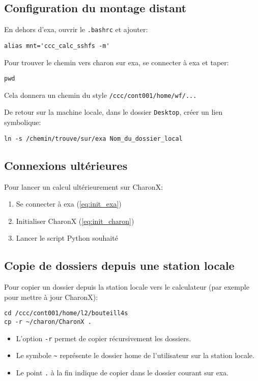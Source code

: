 \documentclass[10pt]{book}
\begin{document}
\begin{appendices}
\subsection{Configuration du montage distant}
En dehors d'exa, ouvrir le \texttt{.bashrc} et ajouter:
\begin{verbatim}
alias mnt='ccc_calc_sshfs -m'
\end{verbatim}
Pour trouver le chemin vers charon sur exa, se connecter à exa et taper:
\begin{verbatim}
pwd
\end{verbatim}
Cela donnera un chemin du style \texttt{/ccc/cont001/home/wf/...}

De retour sur la machine locale, dans le dossier \texttt{Desktop}, créer un lien symbolique:
\begin{verbatim}
ln -s /chemin/trouve/sur/exa Nom_du_dossier_local
\end{verbatim}
\subsection{Connexions ultérieures}
Pour lancer un calcul ultérieurement sur CharonX:
\begin{enumerate}
\item Se connecter à exa (\ref{eq:init_exa})
\item Initialiser CharonX (\ref{eq:init_charon})
\item Lancer le script Python souhaité
\end{enumerate}
\subsection{Copie de dossiers depuis une station locale}
Pour copier un dossier depuis la station locale vers le calculateur (par exemple pour mettre à jour CharonX):
\begin{verbatim}
cd /ccc/cont001/home/l2/bouteill4s
cp -r ~/charon/CharonX .
\end{verbatim}
\begin{itemize}
\item L'option \texttt{-r} permet de copier récursivement les dossiers.
\item Le symbole \texttt{\~{}} représente le dossier home de l'utilisateur sur la station locale.
\item Le point \texttt{.} à la fin indique de copier dans le dossier courant sur exa.
\end{itemize}

\end{appendices}
\end{document}

